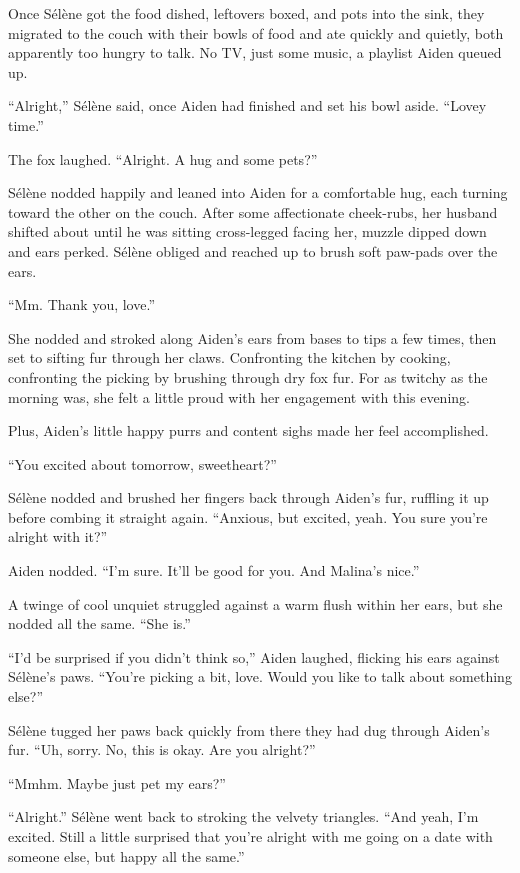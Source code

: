Once Sélène got the food dished, leftovers boxed, and pots into the sink, they migrated to the couch with their bowls of food and ate quickly and quietly, both apparently too hungry to talk. No TV, just some music, a playlist Aiden queued up.

``Alright,'' Sélène said, once Aiden had finished and set his bowl aside. ``Lovey time.''

The fox laughed. ``Alright. A hug and some pets?''

Sélène nodded happily and leaned into Aiden for a comfortable hug, each turning toward the other on the couch. After some affectionate cheek-rubs, her husband shifted about until he was sitting cross-legged facing her, muzzle dipped down and ears perked. Sélène obliged and reached up to brush soft paw-pads over the ears.

``Mm. Thank you, love.''

She nodded and stroked along Aiden's ears from bases to tips a few times, then set to sifting fur through her claws. Confronting the kitchen by cooking, confronting the picking by brushing through dry fox fur. For as twitchy as the morning was, she felt a little proud with her engagement with this evening.

Plus, Aiden's little happy purrs and content sighs made her feel accomplished.

``You excited about tomorrow, sweetheart?''

Sélène nodded and brushed her fingers back through Aiden's fur, ruffling it up before combing it straight again. ``Anxious, but excited, yeah. You sure you're alright with it?''

Aiden nodded. ``I'm sure. It'll be good for you. And Malina's nice.''

A twinge of cool unquiet struggled against a warm flush within her ears, but she nodded all the same. ``She is.''

``I'd be surprised if you didn't think so,'' Aiden laughed, flicking his ears against Sélène's paws. ``You're picking a bit, love. Would you like to talk about something else?''

Sélène tugged her paws back quickly from there they had dug through Aiden's fur. ``Uh, sorry. No, this is okay. Are you alright?''

``Mmhm. Maybe just pet my ears?''

``Alright.'' Sélène went back to stroking the velvety triangles. ``And yeah, I'm excited. Still a little surprised that you're alright with me going on a date with someone else, but happy all the same.''

